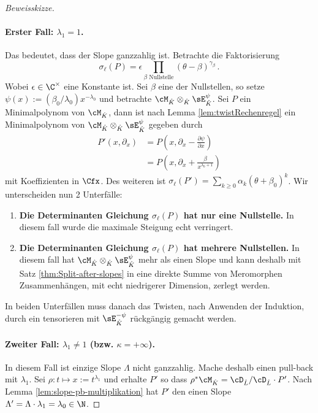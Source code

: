 \begin{proof}[Beweisskizze]
\paragraph{Erster Fall: $\lambda_1=1$.} Das bedeutet, dass der Slope ganzzahlig
ist. Betrachte die Faktorisierung
\[
\sigma_\ell(P)=
  \epsilon\prod_{\beta\text{ Nullstelle}}(\theta-\beta)^{\gamma_\beta}\,.
\]
Wobei $\epsilon\in\C^\times$ eine Konstante ist.  Sei $\beta$  eine der
Nullstellen, so setze $\psi(x):=(\beta_0/\lambda_0)x^{-\lambda_0}$ und
betrachte $\cM_{\hat K}\otimes_{\hat K} \sE_{\hat K}^{\psi}$.
Sei $P$ ein Minimalpolynom von $\cM_{\hat K}$, dann ist nach Lemma
\ref{lem:twistRechenregel} ein Minimalpolynom von 
$\cM_{\hat K}\otimes_{\hat K} \sE_{\hat K}^{\psi}$ gegeben durch
\begin{align*}
P'(x,\partial_x)&=P(x,\partial_x-\frac{\partial \psi}{\partial x})
\\&=P(x,\partial_x+\frac{\beta}{x^{\lambda_0+1}})
\end{align*}
mit Koeffizienten in
$\Cfx$.
Des weiteren ist $\sigma_\ell(P')=\sum_{k\geq 0}\alpha_k(\theta+\beta_0)^k$.
Wir unterscheiden nun 2 Unterfälle:
\begin{enumerate}
\item \textbf{Die Determinanten Gleichung $\sigma_\ell(P)$ hat nur eine
Nullstelle.}
In diesem fall wurde die maximale Steigung echt verringert.
\begin{comment}TODO: Hier weiter \end{comment}
\item \textbf{Die Determinanten Gleichung $\sigma_\ell(P)$ hat mehrere
Nullstellen.}
In diesem fall hat $\cM_{\hat K}\otimes_{\hat K} \sE_{\hat K}^{\psi}$ mehr als
einen Slope und kann deshalb mit Satz \ref{thm:Split-after-slopes} in eine
direkte Summe von Meromorphen Zusammenhängen, mit echt niedrigerer Dimension,
zerlegt werden.
\begin{comment}TODO: Hier weiter \end{comment}
\end{enumerate}
In beiden Unterfällen muss danach das Twisten, nach Anwenden der Induktion,
durch ein tensorieren mit $\sE_{\hat K}^{-\psi}$ rückgängig gemacht werden.

\paragraph{Zweiter Fall: $\lambda_1\neq1$ (bzw. $\kappa = +\infty$).} 
In diesem Fall ist einzige Slope $\Lambda$ nicht ganzzahlig. Mache deshalb
einen pull-back mit $\lambda_1$. Sei $\rho:t\mapsto x:=t^{\lambda_1}$ und
erhalte $P'$ so dass $\rho^*\cM_{\hat K}=\cD_{\hat L}/\cD_{\hat L}\cdot P'$.
Nach Lemma \ref{lem:slope-pb-multiplikation} hat $P'$ den einen Slope
$\Lambda'=\Lambda\cdot\lambda_1=\lambda_0\in\N$.
\begin{comment}
Damit können wir nun die zugehörige Linearform $\ell':=\lambda_0s_0+s_1$
definieren. Es gilt dass
\[
\sigma_{\ell'}(P')=\dots
\]
ist, welches zumindest zwei unterschiedliche Nullstellen hat. Nun wendet man
den zweiten Unterfall des ersten Fall an.
\end{comment}
\end{proof} %
